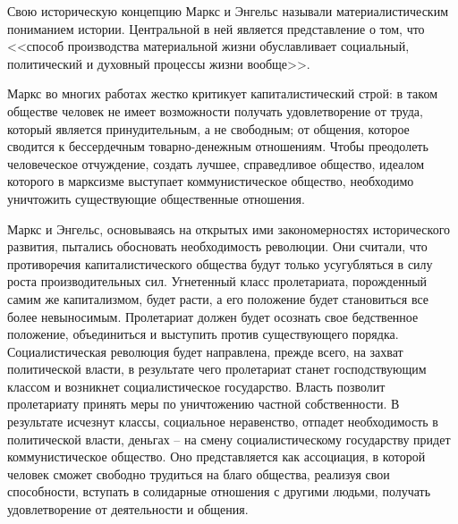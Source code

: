 Свою историческую концепцию Маркс и Энгельс называли материалистическим пониманием истории.
Центральной в ней является представление о том, что <<способ производства материальной жизни
обуславливает социальный, политический и духовный процессы жизни вообще>>.

Маркс во многих работах жестко критикует капиталистический строй: в таком обществе человек не имеет
возможности получать удовлетворение от труда, который является принудительным, а не свободным; от
общения, которое сводится к бессердечным товарно-денежным отношениям. Чтобы преодолеть человеческое
отчуждение, создать лучшее, справедливое общество, идеалом которого в марксизме выступает
коммунистическое общество, необходимо уничтожить существующие общественные отношения.

Маркс и Энгельс, основываясь на открытых ими закономерностях исторического развития, пытались
обосновать необходимость революции. Они считали, что противоречия капиталистического общества будут
только усугубляться в силу роста производительных сил. Угнетенный класс пролетариата, порожденный
самим же капитализмом, будет расти, а его положение будет становиться все более невыносимым.
Пролетариат должен будет осознать свое бедственное положение, объединиться и выступить против
существующего порядка. Социалистическая революция будет направлена, прежде всего, на захват
политической власти, в результате чего пролетариат станет господствующим классом и возникнет
социалистическое государство. Власть позволит пролетариату принять меры по уничтожению частной
собственности. В результате исчезнут классы, социальное неравенство, отпадет необходимость в
политической власти, деньгах – на смену социалистическому государству придет коммунистическое
общество. Оно представляется как ассоциация, в которой человек сможет свободно трудиться на благо
общества, реализуя свои способности, вступать в солидарные отношения с другими людьми, получать
удовлетворение от деятельности и общения.
